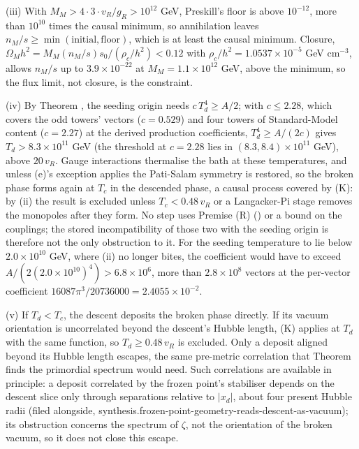 (iii) With $M_{M} > 4 \cdot 3 \cdot v_{R}/g_{R} > 10^{12}$ GeV, Preskill's floor is above $10^{-12}$, more than $10^{10}$ times the causal minimum, so annihilation leaves $n_{M}/s \ge \min(\text{initial}, \text{floor})$, which is at least the causal minimum. Closure, $\Omega_{M}h^{2} = M_{M}(n_{M}/s)s_{0}/(\rho_{c}/h^{2}) < 0.12$ with $\rho_{c}/h^{2} = 1.0537 \times 10^{-5}$ GeV cm$^{-3}$, allows $n_{M}/s$ up to $3.9 \times 10^{-22}$ at $M_{M} = 1.1 \times 10^{12}$ GeV, above the minimum, so the flux limit, not closure, is the constraint.

(iv) By Theorem , the seeding origin needs $c\,T_{d}^{4} \ge A/2$; with $c \le 2.28$, which covers the odd towers' vectors ($c = 0.529$) and four towers of Standard-Model content ($c = 2.27$) at the derived production coefficients, $T_{d}^{4} \ge A/(2c)$ gives $T_{d} > 8.3 \times 10^{11}$ GeV (the threshold at $c = 2.28$ lies in $(8.3, 8.4) \times 10^{11}$ GeV), above $20\,v_{R}$. Gauge interactions thermalise the bath at these temperatures, and unless (e)'s exception applies the Pati-Salam symmetry is restored, so the broken phase forms again at $T_{c}$ in the descended phase, a causal process covered by (K): by (ii) the result is excluded unless $T_{c} < 0.48\,v_{R}$ or a Langacker-Pi stage removes the monopoles after they form. No step uses Premise (R) () or a bound on the couplings; the stored incompatibility of those two with the seeding origin is therefore not the only obstruction to it. For the seeding temperature to lie below $2.0 \times 10^{10}$ GeV, where (ii) no longer bites, the coefficient would have to exceed $A/(2(2.0 \times 10^{10})^{4}) > 6.8 \times 10^{6}$, more than $2.8 \times 10^{8}$ vectors at the per-vector coefficient $16087\pi^{3}/20736000 = 2.4055 \times 10^{-2}$.

(v) If $T_{d} < T_{c}$, the descent deposits the broken phase directly. If its vacuum orientation is uncorrelated beyond the descent's Hubble length, (K) applies at $T_{d}$ with the same function, so $T_{d} \ge 0.48\,v_{R}$ is excluded. Only a deposit aligned beyond its Hubble length escapes, the same pre-metric correlation that Theorem  finds the primordial spectrum would need. Such correlations are available in principle: a deposit correlated by the frozen point's stabiliser depends on the descent slice only through separations relative to $|x_{d}|$, about four present Hubble radii (filed alongside, synthesis.frozen-point-geometry-reads-descent-as-vacuum); its obstruction concerns the spectrum of $\zeta$, not the orientation of the broken vacuum, so it does not close this escape.

